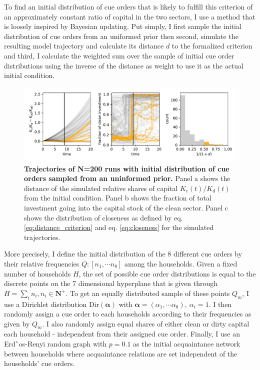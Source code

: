 To find an initial distribution of cue orders that is likely to fulfill this criterion of an approximately constant ratio of capital in the two sectors, I use a method that is loosely inspired by Bayesian updating. Put simply, I first sample the initial distribution of cue orders from an uniformed prior then second, simulate the resulting model trajectory and calculate its distance $d$ to the formalized criterion and third, I calculate the weighted sum over the sample of initial cue order distributions using the inverse of the distance as weight to use it as the actual initial condition.\\


\begin{figure}[t]
  \centering
  \includegraphics[width= \textwidth]{figures/initial_condition_sampling.pdf}
  \caption{\textbf{Trajectories of N=200 runs with initial distribution of cue orders sampled from an uninformed prior.} Panel a shows the distance of the simulated relative shares of capital $K_c(t)/K_d(t)$ from the initial condition. Panel b shows the fraction of total investment going into the capital stock of the clean sector. Panel c shows the distribution of closeness as defined by eq. \ref{eq:distance_criterion} and eq. \ref{eq:closeness} for the simulated trajectories.}
  \label{fig:initial_conditions_sampled}
\end{figure}

More precisely, I define the initial distribution of the 8 different cue orders by their relative frequencies $Q: [n_1, \cdots n_8]$ among the households. Given a fixed number of households $H$, the set of possible cue order distributions is equal to the discrete points on the 7 dimensional hyperplane that is given through $H = \sum_i n_i, n_i \in \mathbf{N^{+}}$. To get an equally distributed sample of these points $Q_m$, I use a Dirichlet distribution $\mathrm{Dir}(\mathbf{\alpha})$ with $\mathbf{\alpha}=(\alpha_1, \cdots \alpha_8), ~ \alpha_i=1$. I then randomly assign a cue order to each households according to their frequencies as given by $Q_m$. I also randomly assign equal shares of either clean or dirty capital each household - independent from their assigned cue order. Finally, I use an Erd\``{o}s-Renyi random graph with $p=0.1$ as the initial acquaintance network between households where acquaintance relations are set independent of the households' cue orders.\\


